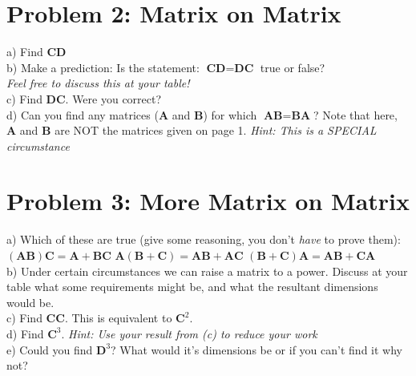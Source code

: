 \documentclass{article}
\begin{document}
\begin{flushleft}
{\section*{Problem 2: Matrix on Matrix}
a)\hspace{.1in} Find \textbf{CD}\\
\vspace{1in}
b) \hspace{.1in}Make a prediction: Is the statement:  $\textbf{CD} = \textbf{DC}$ true or false?\\
\textit{Feel free to discuss this at your table!}\\
\newpage
c) \hspace{.1in}Find \textbf{DC}. Were you correct?\\
\vspace{1.5in}
d) \hspace{.1in}Can you find any matrices (\textbf{A} and \textbf{B}) for which $\textbf{AB}=\textbf{BA}$? Note that here, \textbf{A} and \textbf{B} are NOT the matrices given on page 1. \textit{Hint: This is a SPECIAL circumstance}\\
\vspace{1in}
\section*{Problem 3: More Matrix on Matrix}
a) Which of these are true (give some reasoning, you don't \textit{have} to prove them):\\
$(\textbf{AB})\textbf{C}=\textbf{A}+\textbf{BC}$ \hspace{0.2in} $\textbf{A}(\textbf{B}+\textbf{C})=\textbf{AB}+\textbf{AC}$ \hspace{0.2in} $(\textbf{B}+\textbf{C})\textbf{A}=\textbf{AB}+\textbf{CA}$\\
\vspace{2in}
b) Under certain circumstances we can raise a matrix to a power. Discuss at your table what some requirements might be, and what the resultant dimensions would be.\\
\vspace{1in}
\newpage
c) Find $\textbf{CC}$.  This is equivalent to $\textbf{C}^2$. \\
\vspace{1in}
d) Find $\textbf{C}^3$. \textit{Hint: Use your result from (c) to reduce your work}\\
\vspace{1in}
e) Could you find $\textbf{D}^3$? What would it's dimensions be or if you can't find it why not?
\vspace{0.75in}

}
\end{flushleft}
\end{document}
